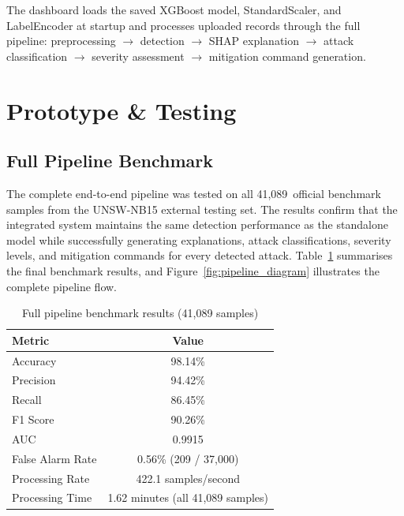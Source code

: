 The dashboard loads the saved XGBoost model, StandardScaler, and LabelEncoder at startup and processes uploaded records through the full pipeline: preprocessing $\rightarrow$ detection $\rightarrow$ SHAP explanation $\rightarrow$ attack classification $\rightarrow$ severity assessment $\rightarrow$ mitigation command generation.

\section{Prototype \& Testing}

\subsection{Full Pipeline Benchmark}

The complete end-to-end pipeline was tested on all 41,089~official benchmark samples from the UNSW-NB15 external testing set. The results confirm that the integrated system maintains the same detection performance as the standalone model while successfully generating explanations, attack classifications, severity levels, and mitigation commands for every detected attack. Table~\ref{tab:benchmark_results} summarises the final benchmark results, and Figure~\ref{fig:pipeline_diagram} illustrates the complete pipeline flow.

\begin{table}[htbp]
    \centering
    \caption{Full pipeline benchmark results (41,089 samples)}
    \label{tab:benchmark_results}
    \begin{tabular}{lc}
        \toprule
        \textbf{Metric} & \textbf{Value} \\
        \midrule
        Accuracy         & 98.14\% \\
        Precision        & 94.42\% \\
        Recall           & 86.45\% \\
        F1 Score         & 90.26\% \\
        AUC              & 0.9915  \\
        False Alarm Rate & 0.56\% (209 / 37,000) \\
        Processing Rate  & 422.1 samples/second \\
        Processing Time  & 1.62 minutes (all 41,089 samples) \\
        \bottomrule
    \end{tabular}
\end{table}

